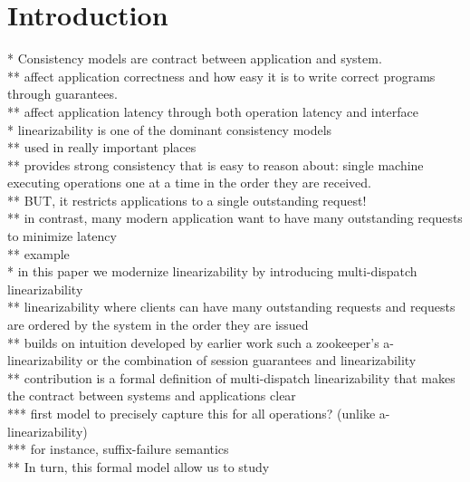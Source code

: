 \section{Introduction}
\label{sec:intro}

* Consistency models are contract between application and system.\\
** affect application correctness and how easy it is to write correct programs through guarantees.\\
** affect application latency through both operation latency and interface\\

* linearizability is one of the dominant consistency models\\
** used in really important places\\
** provides strong consistency that is easy to reason about: single machine executing operations one at a time in the order they are received.\\
** BUT, it restricts applications to a single outstanding request!\\
** in contrast, many modern application want to have many outstanding requests to minimize latency\\
** example\\

* in this paper we modernize linearizability by introducing multi-dispatch linearizability\\
** linearizability where clients can have many outstanding requests and requests are ordered by the system in the order they are issued\\
** builds on intuition developed by earlier work such a zookeeper's a-linearizability or the combination of session guarantees and linearizability\\
** contribution is a formal definition of multi-dispatch linearizability that makes the contract between systems and applications clear\\
*** first model to precisely capture this for all operations? (unlike a-linearizability)\\
*** for instance, suffix-failure semantics\\
** In turn, this formal model allow us to study \mdl\\


